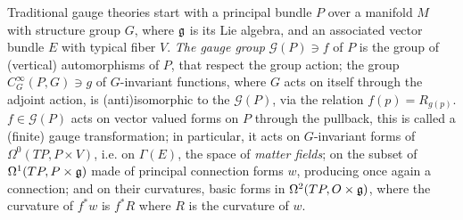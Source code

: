 





Traditional gauge theories start with a principal bundle $P$  over a manifold $M$ with structure group $G$, where $\mathfrak{g}$ is its Lie algebra, and an associated vector bundle $E$ with typical fiber $V$. \emph{The gauge group} $\mathcal G(P) \ni f$ of $P$ is the group of (vertical) automorphisms of $P$, that respect the group action; the group $C^\infty_G(P, G) \ni g$ of $G$-invariant functions, where $G$ acts on itself through the adjoint action, is (anti)isomorphic to the $\mathcal G(P)$, via the relation $f(p) = R_{g(p)}$. $f\in \mathcal G(P)$ acts on vector valued forms on $P$ through the pullback, this is called a (finite) gauge transformation; in particular, it acts on $G$-invariant forms of $\Omega^0(TP, P \times V)$, i.e. on $\Gamma(E)$, the space of \emph{matter fields}; on the subset of $\Omega^1(TP, P \times \mathfrak{g})$ made of principal connection forms $w$, producing once again a connection; and on their curvatures, basic forms in $\Omega^2(TP, O \times \mathfrak{g})$, where the curvature of $f^*w$ is $f^*R$ where $R$ is the curvature of $w$.

